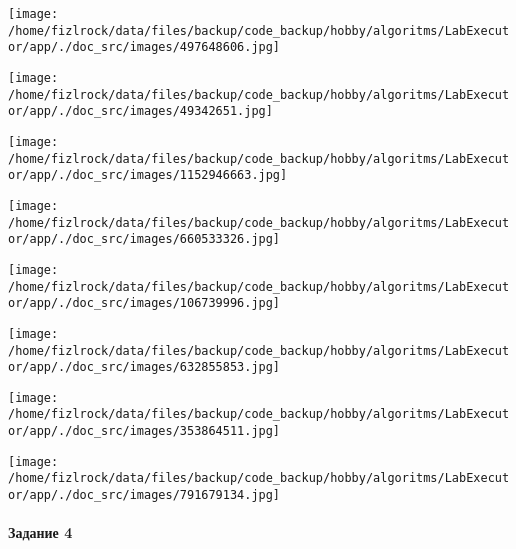 \documentclass[a4paper, 12pt]{article}
\begin{document}
\texttt{[image: /home/fizlrock/data/files/backup/code\_backup/hobby/algoritms/LabExecutor/app/./doc\_src/images/497648606.jpg]}

\texttt{[image: /home/fizlrock/data/files/backup/code\_backup/hobby/algoritms/LabExecutor/app/./doc\_src/images/49342651.jpg]}

\texttt{[image: /home/fizlrock/data/files/backup/code\_backup/hobby/algoritms/LabExecutor/app/./doc\_src/images/1152946663.jpg]}

\texttt{[image: /home/fizlrock/data/files/backup/code\_backup/hobby/algoritms/LabExecutor/app/./doc\_src/images/660533326.jpg]}

\texttt{[image: /home/fizlrock/data/files/backup/code\_backup/hobby/algoritms/LabExecutor/app/./doc\_src/images/106739996.jpg]}

\texttt{[image: /home/fizlrock/data/files/backup/code\_backup/hobby/algoritms/LabExecutor/app/./doc\_src/images/632855853.jpg]}

\texttt{[image: /home/fizlrock/data/files/backup/code\_backup/hobby/algoritms/LabExecutor/app/./doc\_src/images/353864511.jpg]}

\texttt{[image: /home/fizlrock/data/files/backup/code\_backup/hobby/algoritms/LabExecutor/app/./doc\_src/images/791679134.jpg]}
\pagebreak
\paragraph{Задание 4}
\end{document}
